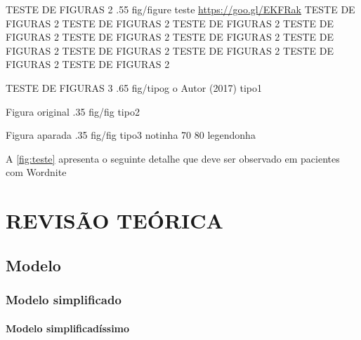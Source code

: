 \figura
{TESTE DE FIGURAS 2} %
{.55} %
{fig/figure} %
{\textcite[1]{abntex2modelo}} %
{teste} %
{\url{https://goo.gl/EKFRak} TESTE DE FIGURAS 2 TESTE DE FIGURAS 2 TESTE DE FIGURAS 2 TESTE DE FIGURAS 2 TESTE DE FIGURAS 2 TESTE DE FIGURAS 2 TESTE DE FIGURAS 2 TESTE DE FIGURAS 2 TESTE DE FIGURAS 2 TESTE DE FIGURAS 2 TESTE DE FIGURAS 2} %
{} %

\figura
{TESTE DE FIGURAS 3} %
{.65} %
{fig/tipog} %
{o Autor (2017)} %
{tipo1} %
{}
{}

\figura
{Figura original} %
{.35} %
{fig/fig} %
{\textcite{luminaria01}} %
{tipo2} %
{}
{}

\figurac
{Figura aparada} %
{.35} %
{fig/fig} %
{\textcite{luminaria01}} %
{tipo3} %
{notinha}   %
{70} %
{80} %
{legendonha}

A \autoref{fig:teste} apresenta o seguinte detalhe que deve ser observado em pacientes com Wordnite

\chapter{REVISÃO TEÓRICA}

\textcite[3.1-3.2]{abntex2modelo}

\textcite{luminaria01}

\textcite{luminaria01}


\textcite{luminaria01}



\textcite{luminaria01}

\textcite{ISO5122:1979}

\section{Modelo}

\subsection{Modelo simplificado}
\newpage
\textcite[3.1-3.2]{abntex2modelo}

\subsubsection{Modelo simplificadíssimo}